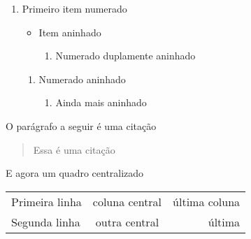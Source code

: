 \documentclass[dsc,male,12pt,a4paper]{ita}
\begin{document}
\begin{enumerate}
	\item Primeiro item numerado
	      \begin{itemize}
		      \item Item aninhado
		            \begin{enumerate}
			            \item Numerado duplamente aninhado
		            \end{enumerate}
	      \end{itemize}
	      \begin{enumerate}
		      \item Numerado aninhado
		            \begin{enumerate}
			            \item Ainda mais aninhado
		            \end{enumerate}
	      \end{enumerate}
\end{enumerate}

O parágrafo a seguir é uma citação
\begin{quotation}
	Essa é uma citação \cite{sacksBIMHandbookGuide2018}
\end{quotation}

E agora um quadro centralizado
\begin{center}
	\begin{tabular}{l|c|r}
		\hline
		Primeira linha & coluna central & última coluna \\
		Segunda linha  & outra central  & última        \\
		\hline
	\end{tabular}
\end{center}

\printbibliography
\end{document}
